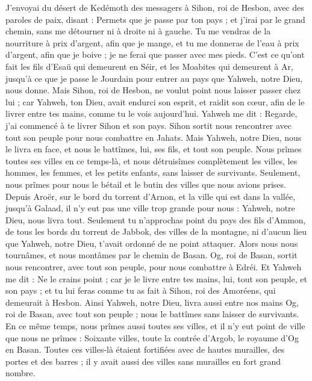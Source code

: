 \begin{multicols}{2}
J'envoyai du désert de Kedémoth des messagers à Sihon, roi de Hesbon, avec des paroles de paix, disant :
Permets que je passe par ton pays ; et j’irai par le grand chemin, sans me détourner ni à droite ni à gauche.
Tu me vendras de la nourriture à prix d’argent, afin que je mange, et tu me donneras de l’eau à prix d’argent, afin que je boive ; je ne ferai que passer avec mes pieds.
C’est ce qu'ont fait les fils d'Esaü qui demeurent en Séir, et les Moabites qui demeurent à Ar, jusqu'à ce que je passe le Jourdain pour entrer au pays que Yahweh, notre Dieu, nous donne.
Mais Sihon, roi de Hesbon, ne voulut point nous laisser passer chez lui ; car Yahweh, ton Dieu, avait endurci son esprit, et raidit son cœur, afin de le livrer entre tes mains, comme tu le vois aujourd'hui.
Yahweh me dit : Regarde, j'ai commencé à te livrer Sihon et son pays.
Sihon sortit nous rencontrer avec tout son peuple pour nous combattre en Jahats.
Mais Yahweh, notre Dieu, nous le livra en face, et nous le battîmes, lui, ses fils, et tout son peuple.
Nous prîmes toutes ses villes en ce temps-là, et nous détruisîmes complètement les villes, les hommes, les femmes, et les petits enfants, sans laisser de survivants.
Seulement, nous prîmes pour nous le bétail et le butin des villes que nous avions prises.
Depuis Aroër, sur le bord du torrent d'Arnon, et la ville qui est dans la vallée, jusqu'à Galaad, il n'y eut pas une ville trop grande pour nous : Yahweh, notre Dieu, nous livra tout.
Seulement tu n’approchas point du pays des fils d’Ammon, de tous les bords du torrent de Jabbok, des villes de la montagne, ni d'aucun lieu que Yahweh, notre Dieu, t’avait ordonné de ne point attaquer.
\VerseOne{}Alors nous nous tournâmes, et nous montâmes par le chemin de Basan. Og, roi de Basan, sortit nous rencontrer, avec tout son peuple, pour nous combattre à Edréi.
Et Yahweh me dit : Ne le crains point ; car je le livre entre tes mains, lui, tout son peuple, et son pays ; et tu lui feras comme tu as fait à Sihon, roi des Amoréens, qui demeurait à Hesbon.
Ainsi Yahweh, notre Dieu, livra aussi entre nos mains Og, roi de Basan, avec tout son peuple ; nous le battîmes sans laisser de survivants.
En ce même temps, nous prîmes aussi toutes ses villes, et il n'y eut point de ville que nous ne prîmes : Soixante villes, toute la contrée d'Argob, le royaume d'Og en Basan.
Toutes ces villes-là étaient fortifiées avec de hautes murailles, des portes et des barres ; il y avait aussi des villes sans murailles en fort grand nombre.

\end{multicols}
